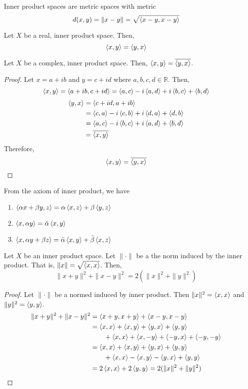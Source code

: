 \begin{remark}
	Inner product spaces are metric spaces with metric 
	\[ d(x,y) = \|x-y\| = \sqrt{\left\langle x-y,x-y \right\rangle} \]
\end{remark}
\begin{remark}
	Let $X$ be a real, inner product space.
	Then, 
	\[ \left\langle x,y \right\rangle = \left\langle y,x \right\rangle \]
\end{remark}
\begin{remark}
	Let $X$ be a complex, inner product space.
	Then, $\left\langle x,y \right\rangle = \overline{\left\langle y,x \right\rangle}$.
\end{remark}
\begin{proof}
	Let $x = a+ib$ and $y = c+id$ where $a,b,c,d \in \mathbb{R}$.
	Then,
	\[ \left\langle x,y \right\rangle = \left\langle a+ib,c+id \right\rangle = \left\langle a,c \right\rangle -i\left\langle a,d \right\rangle + i\left\langle b,c \right\rangle + \left\langle b,d \right\rangle \]
	\begin{align*}
		\left\langle y,x \right\rangle 
		& = \left\langle c+id,a+ib \right\rangle \\
		& = \left\langle c,a \right\rangle -i\left\langle c,b \right\rangle + i\left\langle d,a \right\rangle + \left\langle d,b \right\rangle \\
		& = \left\langle a,c \right\rangle -i\left\langle b,c \right\rangle + i\left\langle a,d \right\rangle + \left\langle b,d \right\rangle \\
		& = \overline{\left\langle x,y \right\rangle}
	\end{align*}
	Therefore,
	\[ \left\langle x,y \right\rangle = \overline{\left\langle y,x \right\rangle} \]
\end{proof}
\begin{remark}
	From the axiom of inner product, we have
	\begin{enumerate}
		\item $ \left\langle \alpha x + \beta y,z \right\rangle = \alpha\left\langle x,z \right\rangle + \beta\left\langle y,z \right\rangle$
		\item $\left\langle x,\alpha y \right\rangle = \bar{\alpha} \left\langle x,y \right\rangle$
		\item $\left\langle x,\alpha y+\beta z \right\rangle = \bar{\alpha}\left\langle x,y \right\rangle + \bar{\beta}\left\langle x,z \right\rangle$
	\end{enumerate}
\end{remark}

\begin{lemma}
	Let $X$ be an inner product space.
	Let $\|\cdot\|$ be a the norm induced by the inner product.
	That is, $\|x\| = \sqrt{\left\langle x,x \right\rangle}$.
	Then,
	\[ \| x+y \|^2 + \| x-y \|^2 = 2(\|x\|^2+\|y\|^2) \]
\end{lemma}
\begin{proof}
	Let $\|\cdot\|$ be a normed induced by inner product.
	Then $\|x\|^2 = \left\langle x,x \right\rangle$ and $\|y\|^2 = \left\langle y,y \right\rangle$.
	\begin{align*}
		\|x+y\|^2+\|x-y\|^2 
		& = \left\langle x+y,x+y \right\rangle + \left\langle x-y,x-y \right\rangle \\
		& = \left\langle x,x \right\rangle + \left\langle x,y \right\rangle + \left\langle y,x \right\rangle + \left\langle y,y \right\rangle \\
		& \qquad + \left\langle x,x \right\rangle + \left\langle x,-y \right\rangle + \left\langle -y,x \right\rangle + \left\langle -y,-y \right\rangle \\
		& = \left\langle x,x \right\rangle + \left\langle x,y \right\rangle + \left\langle y,x \right\rangle + \left\langle y,y \right\rangle \\
		& \qquad + \left\langle x,x \right\rangle - \left\langle x,y \right\rangle - \left\langle y,x \right\rangle + \left\langle y,y \right\rangle \\
		& = 2\left\langle x,x \right\rangle + 2\left\langle y,y \right\rangle = 2(\|x\|^2+\|y\|^2)
	\end{align*}
\end{proof}

